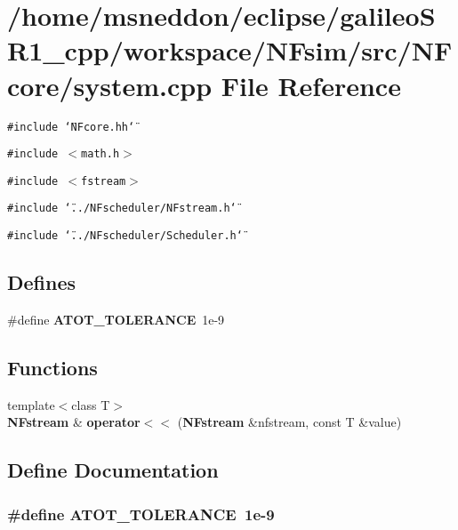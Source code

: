 \section{/home/msneddon/eclipse/galileoSR1\_\-cpp/workspace/NFsim/src/NFcore/system.cpp File Reference}
\label{system_8cpp}


{\tt \#include \char`\"{}NFcore.hh\char`\"{}}\par
{\tt \#include $<$math.h$>$}\par
{\tt \#include $<$fstream$>$}\par
{\tt \#include \char`\"{}../NFscheduler/NFstream.h\char`\"{}}\par
{\tt \#include \char`\"{}../NFscheduler/Scheduler.h\char`\"{}}\par
\subsection*{Defines}
\begin{CompactItemize}
\item 
\#define {\bf ATOT\_\-TOLERANCE}~1e-9
\end{CompactItemize}
\subsection*{Functions}
\begin{CompactItemize}
\item 
{\footnotesize template$<$class T$>$ }\\{\bf NFstream} \& {\bf operator$<$$<$} ({\bf NFstream} \&nfstream, const T \&value)
\end{CompactItemize}


\subsection{Define Documentation}
\subsubsection{\setlength{\rightskip}{0pt plus 5cm}\#define ATOT\_\-TOLERANCE~1e-9}\label{system_8cpp_11dcdd044d0b4c0c37b1b39b9907d6c0}




